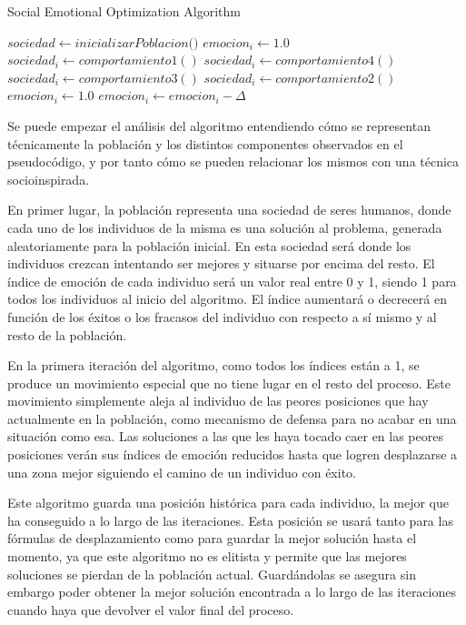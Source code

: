 \begin{algorithm}
	\caption{Social Emotional Optimization Algorithm}
	\begin{algorithmic}[1]
		\State $sociedad \gets \textit{inicializarPoblacion()}$
		\State $emocion_i \gets 1.0$
		\State $sociedad_i \gets comportamiento\textit{1}()$
		\State $sociedad_i \gets comportamiento\textit{4}()$
		\State $sociedad_i \gets comportamiento\textit{3}()$
		\Else
		\State $sociedad_i \gets comportamiento\textit{2}()$
		\EndIf
		\State $emocion_i \gets 1.0$
		\Else
		\State $emocion_i \gets emocion_i - \Delta$
		\EndIf
		\EndWhile
	\end{algorithmic}
\end{algorithm}

Se puede empezar el análisis del algoritmo entendiendo cómo se representan técnicamente la población y los distintos componentes observados en el pseudocódigo, y por tanto cómo se pueden relacionar los mismos con una técnica socioinspirada.

En primer lugar, la población representa una sociedad de seres humanos, donde cada uno de los individuos de la misma es una solución al problema, generada aleatoriamente para la población inicial. En esta sociedad será donde los individuos crezcan intentando ser mejores y situarse por encima del resto. El índice de emoción de cada individuo será un valor real entre 0 y 1, siendo 1 para todos los individuos al inicio del algoritmo. El índice aumentará o decrecerá en función de los éxitos o los fracasos del individuo con respecto a sí mismo y al resto de la población.

En la primera iteración del algoritmo, como todos los índices están a 1, se produce un movimiento especial que no tiene lugar en el resto del proceso. Este movimiento simplemente aleja al individuo de las peores posiciones que hay actualmente en la población, como mecanismo de defensa para no acabar en una situación como esa. Las soluciones a las que les haya tocado caer en las peores posiciones verán sus índices de emoción reducidos hasta que logren desplazarse a una zona mejor siguiendo el camino de un individuo con éxito.

Este algoritmo guarda una posición histórica para cada individuo, la mejor que ha conseguido a lo largo de las iteraciones. Esta posición se usará tanto para las fórmulas de desplazamiento como para guardar la mejor solución hasta el momento, ya que este algoritmo no es elitista y permite que las mejores soluciones se pierdan de la población actual. Guardándolas se asegura sin embargo poder obtener la mejor solución encontrada a lo largo de las iteraciones cuando haya que devolver el valor final del proceso.

